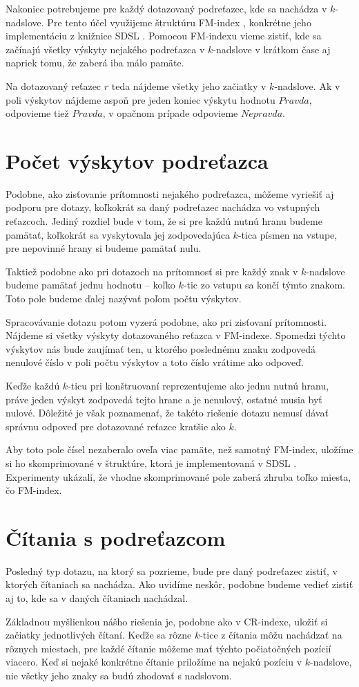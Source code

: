 Nakoniec potrebujeme pre každý dotazovaný podreťazec, kde sa nachádza v $k$-nadslove.
Pre tento účel využijeme štruktúru FM-index \cite{fm_index}, konkrétne jeho implementáciu
z knižnice SDSL \cite{sdsl}. Pomocou FM-indexu vieme zistiť, kde sa začínajú všetky
výskyty nejakého podreťazca v $k$-nadslove v krátkom čase aj napriek tomu, že
zaberá iba málo pamäte.

Na dotazovaný reťazec $r$ teda nájdeme všetky jeho začiatky v $k$-nadslove. Ak
v poli výskytov nájdeme aspoň pre jeden koniec výskytu hodnotu $Pravda$, odpovieme
tiež $Pravda$, v opačnom prípade odpovieme $Nepravda$.

\section{Počet výskytov podreťazca}

Podobne, ako zisťovanie prítomnosti nejakého podreťazca, môžeme vyriešiť aj podporu
pre dotazy, koľkokrát sa daný podreťazec nachádza vo vstupných reťazcoch. Jediný rozdiel
bude v tom, že si pre každú nutnú hranu budeme pamätať, koľkokrát sa vyskytovala jej
zodpovedajúca $k$-tica písmen na vstupe, pre nepovinné hrany si budeme pamätať nulu.

Taktiež podobne ako pri dotazoch na prítomnosť si pre každý znak v $k$-nadslove
budeme pamätať jednu hodnotu -- koľko $k$-tic zo vstupu sa končí týmto znakom. Toto
pole budeme ďalej nazývať poľom počtu výskytov.

Spracovávanie dotazu potom vyzerá podobne, ako pri zisťovaní prítomnosti. Nájdeme
si všetky výskyty dotazovaného reťazca v FM-indexe. Spomedzi týchto výskytov nás
bude zaujímať ten, u ktorého poslednému znaku zodpovedá nenulové číslo
v poli počtu výskytov a toto číslo vrátime ako odpoveď. 

Keďže každú $k$-ticu pri konštruovaní
reprezentujeme ako jednu nutnú hranu, práve jeden výskyt zodpovedá tejto hrane a
je nenulový, ostatné musia byť nulové. Dôležité je však poznamenať, že takéto
riešenie dotazu nemusí dávať správnu odpoveď pre dotazované reťazce kratšie ako $k$.

Aby toto pole čísel nezaberalo oveľa viac pamäte, než samotný FM-index, uložíme
si ho skomprimované v štruktúre, ktorá je implementovaná v SDSL \cite{sdsl}.
Experimenty ukázali, že vhodne skomprimované pole zaberá zhruba toľko miesta,
čo FM-index.

\section{Čítania s podreťazcom}

Posledný typ dotazu, na ktorý sa pozrieme, bude pre daný podreťazec zistiť, v
ktorých čítaniach sa nachádza. Ako uvidíme neskôr, podobne budeme vedieť zistiť
aj to, kde sa v daných čítaniach nachádzal.

Základnou myšlienkou nášho riešenia je, podobne ako v CR-indexe, uložiť si
začiatky jednotlivých čítaní. Keďže sa rôzne $k$-tice z čítania môžu nachádzať
na rôznych miestach, pre každé čítanie môžeme mať týchto počiatočných pozícií viacero.
Keď si nejaké konkrétne čítanie priložíme na nejakú pozíciu v $k$-nadslove,
nie všetky jeho znaky sa budú zhodovať s nadslovom.
